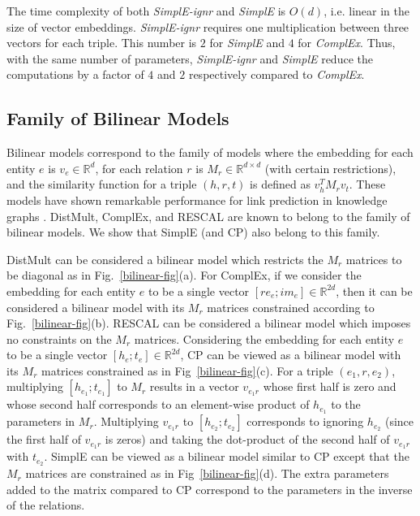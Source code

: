 \documentclass{article}
\newcommand{\triple}[3]{(\mathit{#1}, \mathit{#2}, \mathit{#3})}
\begin{document}
The time complexity of both \emph{SimplE-ignr} and \emph{SimplE} is $O(d)$, i.e. linear in the size of vector embeddings. \emph{SimplE-ignr} requires one multiplication between three vectors for each triple. This number is $2$ for \emph{SimplE} and $4$ for \emph{ComplEx}. 
Thus, with the same number of parameters, \emph{SimplE-ignr} and \emph{SimplE} reduce the computations by a factor of $4$ and $2$ respectively compared to \emph{ComplEx}.

\subsection{Family of Bilinear Models} \label{bilinear-subsection}
Bilinear models correspond to the family of models where the embedding for each entity $e$ is $v_e\in\mathbb{R}^d$, for each relation $r$ is $M_r\in\mathbb{R}^{d\times d}$ (with certain restrictions), and the similarity function for a triple $\triple{h}{r}{t}$ is defined as $v_h^T M_r v_t$.  These models have shown remarkable performance for link prediction in knowledge graphs \cite{nickel2016review}. DistMult, ComplEx, and RESCAL are known to belong to the family of bilinear models. We show that SimplE (and CP) also belong to this family. 

DistMult can be considered a bilinear model which restricts the $M_r$ matrices to be diagonal as in Fig.~\ref{bilinear-fig}(a). For ComplEx, if we consider the embedding for each entity $e$ to be a single vector $[re_e;im_e]\in\mathbb{R}^{2d}$, then it can be considered a bilinear model with its $M_r$ matrices constrained according to Fig.~\ref{bilinear-fig}(b). RESCAL can be considered a bilinear model which imposes no constraints on the $M_r$ matrices. Considering the embedding for each entity $e$ to be a single vector $[h_e;t_e]\in\mathbb{R}^{2d}$, CP can be viewed as a bilinear model with its $M_r$ matrices constrained as in Fig~\ref{bilinear-fig}(c). For a triple $\triple{e_1}{r}{e_2}$, multiplying $[h_{e_1};t_{e_1}]$ to $M_r$ results in a vector $v_{e_1r}$ whose first half is zero and whose second half corresponds to an element-wise product of $h_{e_1}$ to the parameters in $M_r$. Multiplying $v_{e_1r}$ to $[h_{e_2};t_{e_2}]$ corresponds to ignoring $h_{e_2}$ (since the first half of $v_{e_1r}$ is zeros) and taking the dot-product of the second half of $v_{e_1r}$ with $t_{e_2}$. SimplE can be viewed as a bilinear model similar to CP except that the $M_r$ matrices are constrained as in Fig~\ref{bilinear-fig}(d). The extra parameters added to the matrix compared to CP correspond to the parameters in the inverse of the relations. 
\end{document}
